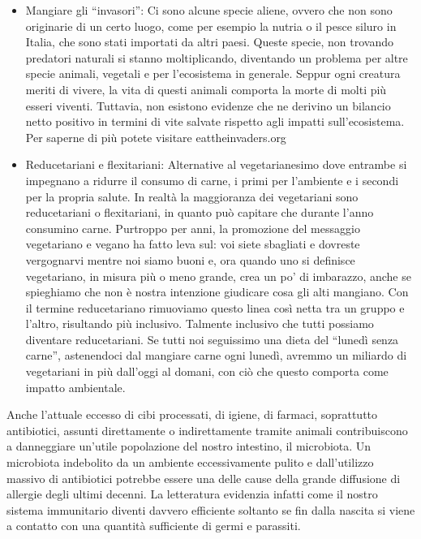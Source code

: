 \documentclass[12pt]{book} %
\begin{document}
\begin{itemize}
\item Mangiare gli “invasori”: Ci sono alcune specie aliene, ovvero che non sono originarie di un certo luogo, come
per esempio la nutria o il pesce siluro in Italia, che sono stati importati da altri paesi. Queste specie, non
trovando predatori naturali si stanno moltiplicando, diventando un problema per altre specie animali, vegetali e
per l'ecosistema in generale. Seppur ogni creatura meriti di vivere, la vita di questi
animali comporta la morte di molti più esseri viventi. Tuttavia, non esistono evidenze che ne derivino un bilancio netto positivo in termini di vite salvate rispetto agli impatti sull’ecosistema. Per saperne di più potete visitare eattheinvaders.org
\item Reducetariani e flexitariani: Alternative al vegetarianesimo dove entrambe si impegnano a ridurre il consumo di carne, i primi per l'ambiente e i secondi per la propria salute. In realtà la maggioranza dei vegetariani sono reducetariani o flexitariani, in quanto può capitare che durante l'anno consumino carne. Purtroppo per anni, la promozione del
messaggio vegetariano e vegano ha fatto leva sul: voi siete sbagliati e dovreste vergognarvi mentre noi siamo buoni e,
ora quando uno si definisce vegetariano, in misura più o meno grande, crea un po' di imbarazzo, anche se
spieghiamo che non è nostra intenzione giudicare cosa gli alti mangiano. Con il termine reducetariano rimuoviamo questo
linea così netta tra un gruppo e l'altro, risultando più inclusivo. Talmente inclusivo che tutti
possiamo diventare reducetariani. Se tutti noi seguissimo una dieta del “lunedì senza carne”, astenendoci dal mangiare
carne ogni lunedì, avremmo un miliardo di vegetariani in più dall'oggi al domani, con ciò che questo comporta come impatto ambientale.
\end{itemize}

\begin{mdframed}[linewidth=1pt]
Anche l'attuale eccesso di cibi processati, di igiene, di farmaci, soprattutto antibiotici, assunti
direttamente o indirettamente tramite animali contribuiscono a danneggiare un'utile popolazione
del nostro intestino, il microbiota. Un microbiota indebolito da un ambiente eccessivamente pulito e
dall'utilizzo massivo di antibiotici potrebbe essere una delle cause della grande diffusione di
allergie degli ultimi decenni. La letteratura evidenzia infatti come il nostro sistema immunitario diventi davvero
efficiente soltanto se fin dalla nascita si viene a contatto con una quantità sufficiente di germi e parassiti. 
\end{mdframed}
\end{document}
